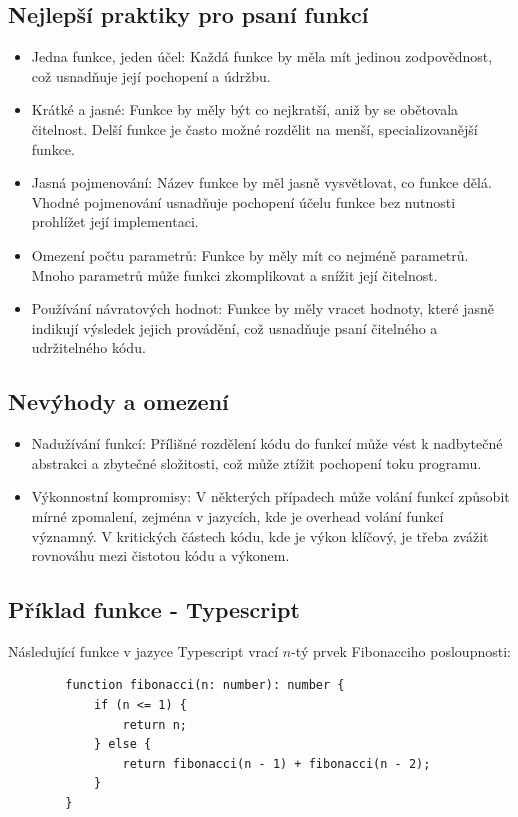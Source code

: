 \documentclass{article}
\begin{document}
\begin{Čistý kód - Funkce}
        \subsection{Nejlepší praktiky pro psaní funkcí}\label{subsec:nejlepsi-praktiky-pro-psani-funkci}
        \begin{itemize}
            \item Jedna funkce, jeden účel: Každá funkce by měla mít jedinou zodpovědnost, což usnadňuje její pochopení a údržbu.
            \item Krátké a jasné: Funkce by měly být co nejkratší, aniž by se obětovala čitelnost.
            Delší funkce je často možné rozdělit na menší, specializovanější funkce.
            \item Jasná pojmenování: Název funkce by měl jasně vysvětlovat, co funkce dělá.
            Vhodné pojmenování usnadňuje pochopení účelu funkce bez nutnosti prohlížet její implementaci.
            \item Omezení počtu parametrů: Funkce by měly mít co nejméně parametrů.
            Mnoho parametrů může funkci zkomplikovat a snížit její čitelnost.
            \item Používání návratových hodnot: Funkce by měly vracet hodnoty, které jasně indikují výsledek jejich provádění, což usnadňuje psaní čitelného a udržitelného kódu.
        \end{itemize}

        \subsection{Nevýhody a omezení}\label{subsec:nevyhody-a-omezeni}
        \begin{itemize}
            \item Nadužívání funkcí: Přílišné rozdělení kódu do funkcí může vést k nadbytečné abstrakci a zbytečné složitosti, což může ztížit pochopení toku programu.
            \item Výkonnostní kompromisy: V některých případech může volání funkcí způsobit mírné zpomalení, zejména v jazycích, kde je overhead volání funkcí významný.
            V kritických částech kódu, kde je výkon klíčový, je třeba zvážit rovnováhu mezi čistotou kódu a výkonem.
        \end{itemize}

        \break

        \subsection{Příklad funkce - Typescript}\label{subsec:priklad-funkce---typescript}
        Následující funkce v jazyce Typescript vrací \(n\)-tý prvek Fibonacciho posloupnosti:
        \begin{verbatim}
        function fibonacci(n: number): number {
            if (n <= 1) {
                return n;
            } else {
                return fibonacci(n - 1) + fibonacci(n - 2);
            }
        }
        \end{verbatim}


\end{Čistý kód - Funkce}
\end{document}
